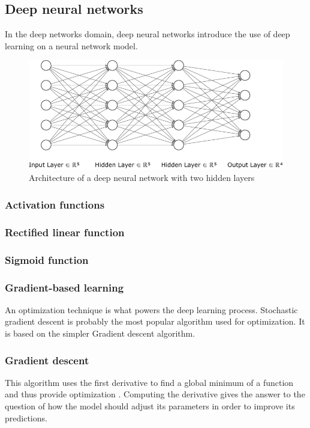 \subsection{Deep neural networks}
In the deep networks domain, deep neural networks introduce the use of deep learning on a neural network model.
\begin{figure}[!ht]
\centering
\includegraphics[width=12cm]{assets/images/DNN}
\caption{Architecture of a deep neural network with two hidden layers 
\label{fig:DNN}}
\end{figure}

\subsubsection{Activation functions}
\subsubsection*{Rectified linear function}
\subsubsection*{Sigmoid function}
\subsubsection{Gradient-based learning}
An optimization technique is what powers the deep learning process. Stochastic gradient descent is probably the most popular algorithm used for optimization. It is based on the simpler Gradient descent algorithm.
\subsubsection*{Gradient descent}
This algorithm uses the first derivative to find a global minimum of a function and thus provide optimization \cite{deeplearningbook}. Computing the derivative gives the answer to the question of how the model should adjust its parameters in order to improve its predictions.


